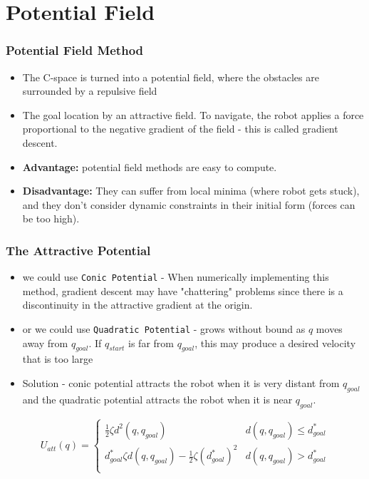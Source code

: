 \documentclass[handout]{beamer}
\begin{document}
  \section[Potential Field]{Potential Field}

  \begin{frame}
    \frametitle{Potential Field Method}
    \begin{itemize}
      \item The C-space is turned into a potential field, where the obstacles are surrounded by a repulsive field
      \item The goal location by an attractive field. To navigate, the robot applies a force proportional to the negative gradient of the field - this is called gradient descent.
      \item \textbf{Advantage:} potential field methods are easy to compute.
      \item \textbf{Disadvantage:} They can suffer from local minima (where robot gets stuck), and they don't consider dynamic constraints in their initial form (forces can be too high).
    \end{itemize}
  \end{frame}

  \begin{frame}
    \frametitle{The Attractive Potential}
    \begin{itemize}
      \item we could use \texttt{Conic Potential} - When numerically implementing this method, gradient descent may have "chattering" problems since there is a discontinuity in the attractive gradient at the origin. 
      \item or we could use \texttt{Quadratic Potential} - grows without bound as $q$ moves away from $q_{goal}$. If $q_{start}$ is far from $q_{goal}$, this may produce a desired velocity that is too large
      \item Solution - conic potential attracts the robot when it is very distant from $q_{goal}$ and the quadratic potential attracts the robot when it is near $q_{goal}$. 
    \end{itemize}

    \centering

    \begin{equation}
      U_{att}(q) =
        \begin{cases}
          \frac{1}{2}\zeta d^{2}(q, q_{goal})  & d(q, q_{goal}) \leq d^{*}_{goal}\\
          d^{*}_{goal}\zeta d(q, q_{goal}) - \frac{1}{2}\zeta (d^{*}_{goal})^{2} & d(q, q_{goal}) > d^{*}_{goal}\\
        \end{cases}       
    \end{equation}

  \end{frame}
  
\end{document}
